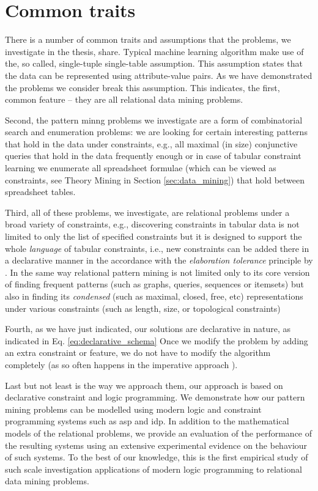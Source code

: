 \pubrev
\section{Common traits}\label{sec:common}
There is a number of common traits and assumptions that the problems, we
investigate in the thesis, share. Typical machine learning algorithm
make use of the, so called, single-tuple single-table assumption. This
assumption states that the data can be represented using
attribute-value pairs. As we have demonstrated the problems we
consider break this assumption. This indicates, the first, common
feature -- they are all relational data  mining problems. 

Second, the pattern minng problems we investigate are a form of combinatorial search and
enumeration problems: we are looking for certain interesting patterns that hold in the data under constraints, e.g., all maximal
(in size) conjunctive queries that hold in the data frequently enough
or in case of tabular constraint learning we enumerate all spreadsheet
formulae (which can be viewed as constraints, see Theory Mining in
Section \ref{sec:data_mining}) that hold between
spreadsheet tables.


Third, all of these problems, we investigate, are relational problems under a
broad variety of constraints, e.g., discovering constraints in tabular
data is not limited to only the list of specified constraints but it
is designed to support the whole \textit{language} of tabular
constraints, i.e., new constraints can be added there in a declarative
manner in the accordance with the \textit{elaboration tolerance}
principle by \textcite{elaboration_tolerance}. In the same way
relational pattern mining is not limited only to its core version of
finding frequent patterns (such as graphs, queries, sequences or
itemsets) but also in finding its \textit{condensed} (such as maximal,
closed, free, etc) representations
under various constraints (such as length, size, or topological
constraints)

Fourth, as we have just indicated, our solutions are declarative in
nature, as indicated in Eq. \ref{eq:declarative_schema} Once we modify
the problem by adding an extra constraint or feature, we do not have
to modify the algorithm completely (as so often happens in the imperative approach \parencite{gspan,clospan}).

Last but not least is the way we approach them, our approach is based
on declarative constraint and logic programming. We demonstrate how
our pattern mining problems can be modelled using modern
logic and constraint programming systems such as \acrshort{asp} and \acrshort{idp}. In addition to the mathematical models
of the relational problems, we provide an evaluation of the
 performance of the resulting systems using an extensive experimental evidence on the behaviour of such systems. To the best of our knowledge, this is the first empirical study of such scale investigation applications of modern logic programming to relational data mining problems.
\pubrevend

